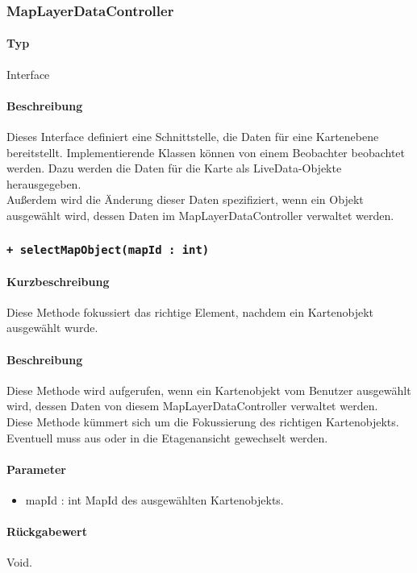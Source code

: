 \subsubsection{MapLayerDataController}
\paragraph*{Typ} 
Interface
\paragraph*{Beschreibung}
Dieses Interface definiert eine Schnittstelle, die Daten für eine Kartenebene bereitstellt.
Implementierende Klassen können von einem Beobachter beobachtet werden. Dazu werden die 
Daten für die Karte als LiveData-Objekte herausgegeben.\\
Außerdem wird die Änderung dieser Daten spezifiziert, wenn ein Objekt ausgewählt wird, dessen
Daten im MapLayerDataController verwaltet werden.

\subsubsection*{\texttt{+ selectMapObject(mapId : int)}}%
\paragraph*{Kurzbeschreibung}
Diese Methode fokussiert das richtige Element, nachdem ein Kartenobjekt ausgewählt wurde.
\paragraph*{Beschreibung}
Diese Methode wird aufgerufen, wenn ein Kartenobjekt vom Benutzer ausgewählt wird, dessen 
Daten von diesem MapLayerDataController verwaltet werden.\\
Diese Methode kümmert sich um die Fokussierung des richtigen Kartenobjekts. Eventuell muss 
aus oder in die Etagenansicht gewechselt werden.
\paragraph*{Parameter}
\begin{itemize}
    \item mapId : int MapId des ausgewählten Kartenobjekts.
\end{itemize}
\paragraph*{Rückgabewert}
Void.


